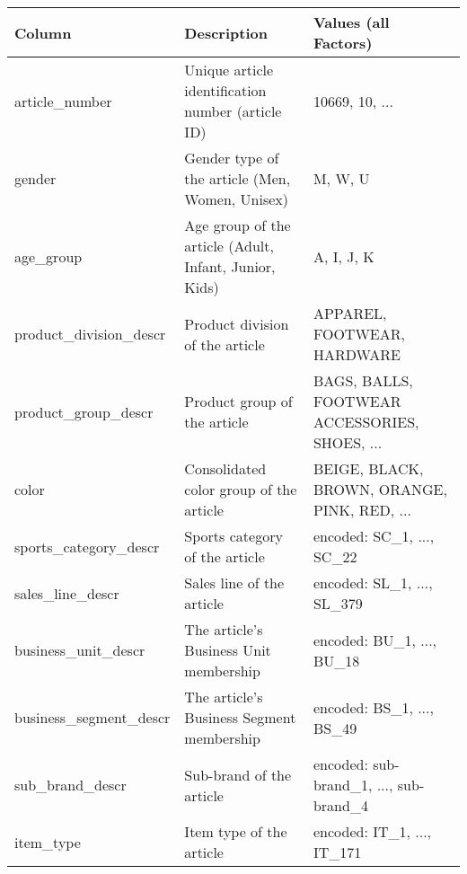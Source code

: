 \begin{table}[H]
\setlength\arrayrulewidth{1pt}  
\centering
\begin{adjustbox}{max width=\textwidth}
\begin{tabular}{|l|l|l|}
\hline
\rowcolor{Gray}
\textbf{Column}           & \textbf{Description}                                   & \textbf{Values (all Factors)}                 \\ \hline
article\_number           & Unique article identification number (article ID)      & 10669, 10, ...                                \\ \hline
gender                    & Gender type of the article (Men, Women, Unisex)        & M, W, U                                       \\ \hline
age\_group                & Age group of the article (Adult, Infant, Junior, Kids) & A, I, J, K                                    \\ \hline
product\_division\_descr  & Product division of the article                        & APPAREL, FOOTWEAR, HARDWARE                   \\ \hline
product\_group\_descr     & Product group of the article                           & BAGS, BALLS, FOOTWEAR ACCESSORIES, SHOES, ... \\ \hline
color                     & Consolidated color group of the article                & BEIGE, BLACK, BROWN, ORANGE, PINK, RED, ...   \\ \hline
sports\_category\_descr   & Sports category of the article                         & encoded: SC\_1, ..., SC\_22                   \\ \hline
sales\_line\_descr        & Sales line of the article                              & encoded: SL\_1, ..., SL\_379                  \\ \hline
business\_unit\_descr     & The article's Business Unit membership                 & encoded: BU\_1, ..., BU\_18                   \\ \hline
business\_segment\_descr  & The article's Business Segment membership              & encoded: BS\_1, ..., BS\_49                   \\ \hline
sub\_brand\_descr         & Sub-brand of the article                               & encoded: sub-brand\_1, ..., sub-brand\_4      \\ \hline
item\_type                & Item type of the article                               & encoded: IT\_1, ..., IT\_171                  \\ \hline

\end{tabular}
\end{adjustbox}
\end{table}
